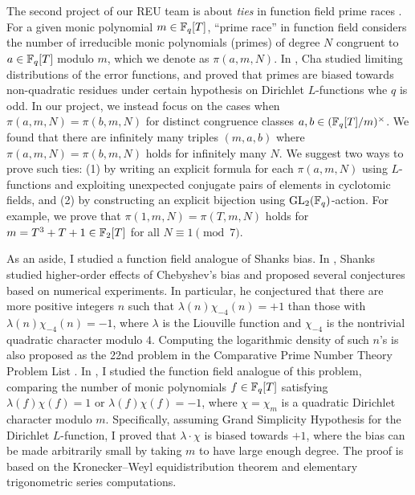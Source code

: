 \documentclass[letterpaper, 10pt]{article}
\begin{document}
The second project of our REU team is about \emph{ties} in function field prime races \cite{bjlls2025tie}.
For a given monic polynomial \(m \in \mathbb{F}_q[T]\), ``prime race'' in function field considers the number of irreducible monic polynomials (primes) of degree \(N\) congruent to \(a \in \mathbb{F}_q[T]\) modulo \(m\), which we denote as \(\pi(a, m, N)\).
In \cite{cha2008chebyshev}, Cha studied limiting distributions of the error functions, and proved that primes are biased towards non-quadratic residues under certain hypothesis on Dirichlet \(L\)-functions whe \(q\) is odd.
In our project, we instead focus on the cases when \(\pi(a, m, N) = \pi(b, m, N)\) for distinct congruence classes \(a, b \in (\mathbb{F}_q[T] / m)^\times\).
We found that there are infinitely many triples \((m, a, b)\) where \(\pi(a, m, N) = \pi(b, m, N)\) holds for infinitely many \(N\).
We suggest two ways to prove such ties: (1) by writing an explicit formula for each \(\pi(a, m, N)\) using \(L\)-functions and exploiting unexpected conjugate pairs of elements in cyclotomic fields, and (2) by constructing an explicit bijection using \(\mathrm{GL}_2(\mathbb{F}_q)\)-action.
For example, we prove that \(\pi(1, m, N) = \pi(T, m, N)\) holds for \(m = T^3 + T + 1 \in \mathbb{F}_2[T]\) for all \(N \equiv 1 \pmod{7}\).

As an aside, I studied a function field analogue of Shanks bias.
In \cite{shanks1959quadratic}, Shanks studied higher-order effects of Chebyshev's bias and proposed several conjectures based on numerical experiments.
In particular, he conjectured that there are more positive integers \(n\) such that \(\lambda(n) \chi_{-4}(n) = +1\) than those with \(\lambda(n) \chi_{-4}(n) = -1\), where \(\lambda\) is the Liouville function and \(\chi_{-4}\) is the nontrivial quadratic character modulo \(4\).
Computing the logarithmic density of such \(n\)'s is also proposed as the 22nd problem in the Comparative Prime Number Theory Problem List \cite{hamieh2024comparative}.
In \cite{lee2025shanks}, I studied the function field analogue of this problem, comparing the number of monic polynomials \(f \in \mathbb{F}_q[T]\) satisfying \(\lambda(f) \chi(f) = 1\) or \(\lambda(f) \chi(f) = -1\), where \(\chi = \chi_m\) is a quadratic Dirichlet character modulo \(m\).
Specifically, assuming Grand Simplicity Hypothesis for the Dirichlet \(L\)-function, I proved that \(\lambda \cdot \chi\) is biased towards \(+1\), where the bias can be made arbitrarily small by taking \(m\) to have large enough degree.
The proof is based on the Kronecker--Weyl equidistribution theorem and elementary trigonometric series computations.
\end{document}
